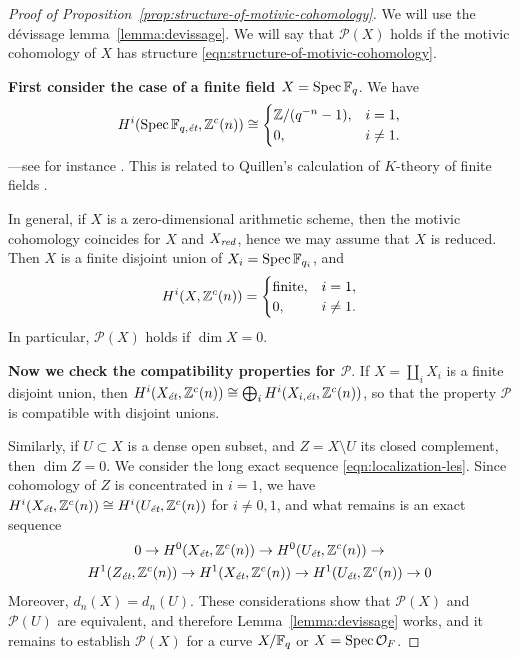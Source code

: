 \documentclass[draft]{article}
\numberwithin{equation}{section}
\begin{document}
\begin{proof}[Proof of Proposition~\ref{prop:structure-of-motivic-cohomology}]
  We will use the d\'{e}vissage lemma~\ref{lemma:devissage}. We will say that
  $\mathcal{P} (X)$ holds if the motivic cohomology of $X$ has structure
  \eqref{eqn:structure-of-motivic-cohomology}.

  \vspace{1em}

  \textbf{First consider the case of a finite field $X = \Spec \FF_q$}.
  We have
  \begin{equation}
    \label{eqn:motivic-cohomology-finite-fields}
    H^i (\Spec \FF_{q,\et}, \ZZ^c (n)) \cong
    \begin{cases}
      \ZZ/(q^{-n} - 1), & i = 1, \\
      0, & i \ne 1.
    \end{cases}
  \end{equation}
  ---see for instance \cite[Example~4.2]{Geisser-2017}. This is related to
  Quillen's calculation of $K$-theory of finite fields \cite{Quillen-1972}.

  In general, if $X$ is a zero-dimensional arithmetic scheme, then the motivic
  cohomology coincides for $X$ and $X_\red$, hence we may assume that $X$ is
  reduced. Then $X$ is a finite disjoint union of $X_i = \Spec \FF_{q_i}$, and
  \begin{equation}
    H^i (X, \ZZ^c (n)) = \begin{cases}
      \text{finite}, & i = 1, \\
      0, & i \ne 1.
    \end{cases}
  \end{equation}
  In particular, $\mathcal{P} (X)$ holds if $\dim X = 0$.

  \vspace{1em}

  \textbf{Now we check the compatibility properties for $\mathcal{P}$}.
  If $X = \coprod_i X_i$ is a finite disjoint union, then
  $H^i (X_\et, \ZZ^c (n)) \cong \bigoplus_i H^i (X_{i,\et}, \ZZ^c (n))$,
  so that the property $\mathcal{P}$ is compatible with disjoint unions.

  Similarly, if $U \subset X$ is a dense open subset, and $Z = X\setminus U$
  its closed complement, then $\dim Z = 0$. We consider the long exact sequence
  \eqref{eqn:localization-les}. Since cohomology of $Z$ is concentrated in
  $i = 1$, we have $H^i (X_\et, \ZZ^c (n)) \cong H^i (U_\et, \ZZ^c (n))$ for
  $i \ne 0,1$, and what remains is an exact sequence
  \begin{multline*}
    0 \to H^0 (X_\et, \ZZ^c (n)) \to
    H^0 (U_\et, \ZZ^c (n)) \to \\
    H^1 (Z_\et, \ZZ^c (n)) \to
    H^1 (X_\et, \ZZ^c (n)) \to
    H^1 (U_\et, \ZZ^c (n)) \to 0
  \end{multline*}
  Moreover, $d_n (X) = d_n (U)$. These considerations show that
  $\mathcal{P} (X)$ and $\mathcal{P} (U)$ are equivalent, and therefore
  Lemma~\ref{lemma:devissage} works, and it remains to establish
  $\mathcal{P} (X)$ for a curve $X/\FF_q$ or $X = \Spec \mathcal{O}_F$.


\end{proof}
\end{document}
